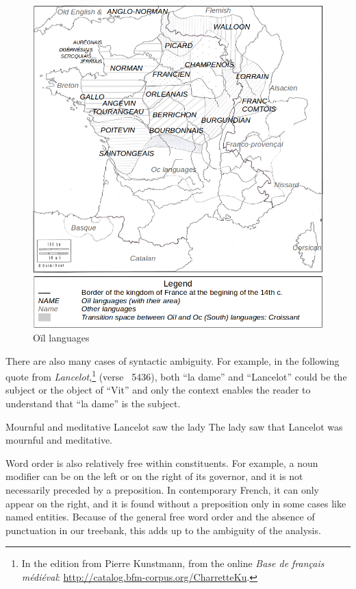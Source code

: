 \begin{figure}[thb]
    \centering
    \includegraphics[scale=0.29]{static/media/mod_eval/bertrade/map-dialects2.png}
    \caption{Oïl languages}
    \label{fig:map-dialects}
\end{figure}

There are also many cases of syntactic ambiguity. For example, in the following quote from \emph{Lancelot},\footnote{In the edition from Pierre Kunstmann, from the online \textit{Base de français médiéval}: \url{http://catalog.bfm-corpus.org/CharretteKu}.} (verse ~5436),
both \enquote{la dame} and \enquote{Lancelot} could be the subject or the object of \enquote{Vit} and only the context enables the reader to understand that \enquote{la dame} is the subject.

    {Mournful and meditative Lancelot saw the lady}
    {The lady saw that Lancelot was mournful and meditative.}

Word order is also relatively free within constituents. For example, a noun modifier can be on the left or on the right of its governor, and it is not necessarily preceded by a preposition. In contemporary French, it can only appear on the right, and it is found without a preposition only in some cases like named entities. Because of the general free word order and the absence of punctuation in our treebank, this adds up to the ambiguity of the analysis.

